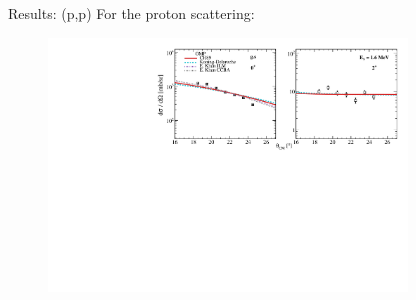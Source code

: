 \documentclass[aspectratio=43, dvipsnames]{beamer}
\newcommand{\iso}[2]{\ce{^{#1}#2}}
\begin{document}
\begin{frame}{Results: \iso{20}{O}(p,p)}
	For the proton scattering:
	\begin{figure}
		\includegraphics[width=0.85\textwidth]{figures/p_ang.pdf}
	\end{figure}
	\begin{columns}[c]
		\begin{column}{0.55\linewidth}
		\end{column}%
		\begin{column}{0.45\linewidth}
		\end{column}
	\end{columns}

\end{frame}
\end{document}
